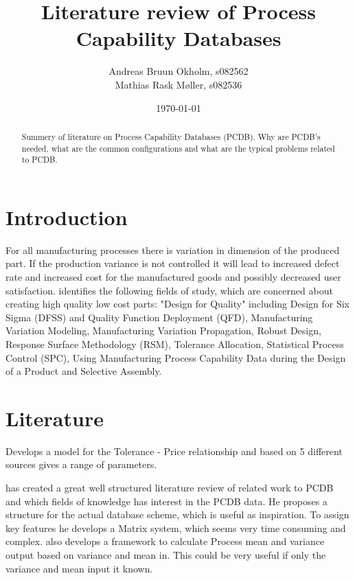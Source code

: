 \documentclass[aip,amsmath,reprint, author-year]{revtex4-1}
\begin{document}
\begin{abstract}
Summery of literature on Process Capability Databases (PCDB). Why are PCDB's needed, what are the common configurations and what are the typical problems related to PCDB.
\end{abstract}

\title{Literature review of Process Capability Databases}
\author{Andreas Bruun Okholm, s082562\\
Mathias Rask Møller, s082536 }  
 
\date{\today}
\maketitle


\section{Introduction}
For all manufacturing processes there is variation in dimension of the produced part. 
If the production variance is not controlled it will lead to increased defect rate and increased cost for the manufactured goods and possibly decreased user satisfaction. 
\citet{kern2003forecasting} identifies the following fields of study, which are concerned about creating high quality low cost parts: "Design for Quality" including Design for Six Sigma (DFSS) and Quality Function Deployment (QFD), Manufacturing Variation Modeling, Manufacturing Variation Propagation, Robust Design, Response Surface Methodology (RSM), Tolerance Allocation, Statistical Process Control (SPC), Using Manufacturing Process Capability Data during the Design of a Product and Selective Assembly.


\section{Literature}

\citet{sfantsikopoulos1990cost} Develops a model for the Tolerance - Price relationship and based on 5 different sources gives a range of parameters. 

\citet{kern2003forecasting} has created a great well structured literature review of related work to PCDB and which fields of knowledge has interest in the PCDB data. He proposes a structure for the actual database scheme, which is useful as inspiration. To assign key features he develops a Matrix system, which seems very time consuming and complex. \citet{kern2003forecasting} also develops a framework to calculate Process mean and variance output based on variance and mean in. This could be very useful if only the variance and mean input it known.
\end{document}
